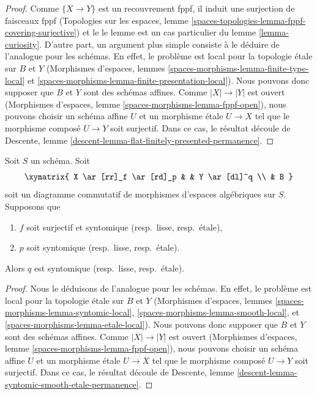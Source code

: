 \begin{proof}
Comme $\{X \to Y\}$ est un recouvrement fppf, il induit une surjection de
faisceaux fppf (Topologies sur les espaces, lemme
\ref{spaces-topologies-lemma-fppf-covering-surjective}) et le
le lemme est un cas particulier du lemme \ref{lemma-curiosity}.
D'autre part, un argument plus simple consiste à le déduire de
l'analogue pour les schémas. En effet, le problème est local pour la topologie \'etale
sur $B$ et $Y$ (Morphismes d'espaces, lemmes
\ref{spaces-morphisms-lemma-finite-type-local} et
\ref{spaces-morphisms-lemma-finite-presentation-local}).
Nous pouvons donc supposer que $B$ et $Y$ sont des
schémas affines. Comme $|X| \to |Y|$ est ouvert
(Morphismes d'espaces, lemme \ref{spaces-morphisms-lemma-fppf-open}),
nous pouvons choisir un
schéma affine $U$ et un morphisme \'etale $U \to X$ tel que le
morphisme composé $U \to Y$ soit surjectif. Dans ce cas, le résultat
découle de Descente, lemme
\ref{descent-lemma-flat-finitely-presented-permanence}.
\end{proof}

\begin{lemma}
\label{lemma-syntomic-smooth-etale-permanence}
Soit $S$ un schéma. Soit
$$
\xymatrix{
X \ar[rr]_f \ar[rd]_p & &
Y \ar[dl]^q \\
& B
}
$$
soit un diagramme commutatif de morphismes d'espaces algébriques sur $S$.
Supposons que
\begin{enumerate}
\item $f$ soit surjectif et syntomique (resp.\ lisse, resp.\ \'etale),
\item $p$ soit syntomique (resp.\ lisse, resp.\ \'etale).
\end{enumerate}
Alors $q$ est syntomique (resp.\ lisse, resp.\ \'etale).
\end{lemma}

\begin{proof}
Nous le déduisons de l'analogue pour les schémas.
En effet, le problème est local pour la topologie \'etale sur $B$ et $Y$
(Morphismes d'espaces, lemmes
\ref{spaces-morphisms-lemma-syntomic-local},
\ref{spaces-morphisms-lemma-smooth-local}, et
\ref{spaces-morphisms-lemma-etale-local}).
Nous pouvons donc supposer que $B$ et $Y$ sont des
schémas affines. Comme $|X| \to |Y|$ est ouvert
(Morphismes d'espaces, lemme \ref{spaces-morphisms-lemma-fppf-open}),
nous pouvons choisir un
schéma affine $U$ et un morphisme \'etale $U \to X$ tel que le
morphisme composé $U \to Y$ soit surjectif. Dans ce cas, le résultat
découle de Descente, lemme
\ref{descent-lemma-syntomic-smooth-etale-permanence}.
\end{proof}

